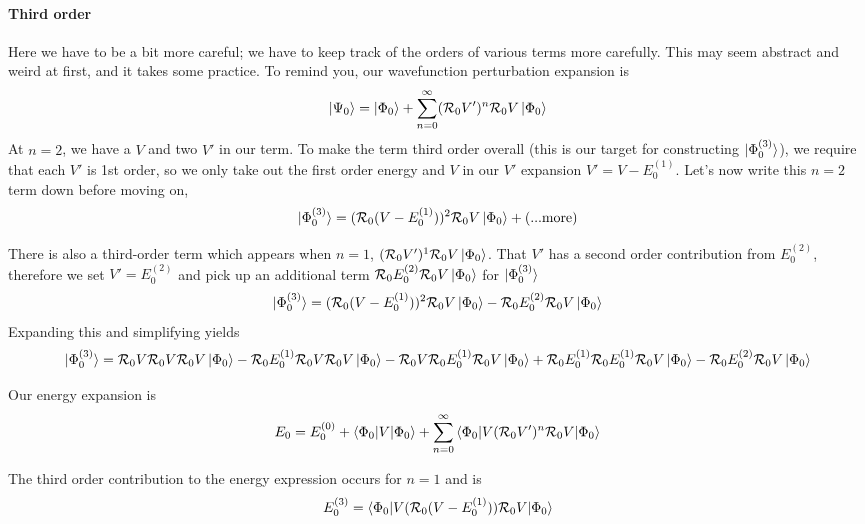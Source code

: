 \documentclass{article}
\newcommand{\Ezero}{E^{(0)}}
\newcommand{\Rz}{\mathcal{R}_{0}}
\newcommand{\Eone}{E^{(1)}}
\begin{document}
\paragraph{\textbf{Third order}}
Here we have to be a bit more careful; we have to keep track of the orders of various terms
more carefully. This may seem abstract and weird at first, and it takes some practice.
To remind you, our wavefunction perturbation expansion is 
\[\ket{\Psi_0} =  \ket{\Phi_0} + \sum_{n=0}^{\infty} (\Rz V')^n \Rz V \ket{\Phi_0} \]
At $n=2$, we have a $V$ and two $V'$ in our term.
To make the term third order overall (this is our target for constructing $\ket{\Phi_0^{(3)}}$),
we require that each $V'$ is 1st order, so we only take out the first order
energy and $V$ in our $V'$ expansion $V' = V - E_0^{(1)}$.
Let's now write this $n=2$ term down before moving on, 
\[\ket{\Phi_0^{(3)}} = (\Rz (V - \Eone_0))^2 \Rz V \ket{\Phi_0} + (... \mathrm{more})\]

There is also a third-order term which appears when $n=1$,
$(\Rz V')^1 \Rz V \ket{\Phi_0}$. That $V'$ has a second order contribution from $E_0^{(2)}$,
therefore we set $V' = E_0^{(2)}$ and 
pick up an additional term $ \Rz E_0^{(2)} \Rz V \ket{\Phi_0}$ for $\ket{\Phi_0^{(3)}}$
\[\ket{\Phi_0^{(3)}} = (\Rz (V - \Eone_0))^2 \Rz V \ket{\Phi_0} - \Rz E_0^{(2)} \Rz V \ket{\Phi_0} \]
Expanding this and simplifying yields
\[\ket{\Phi_0^{(3)}} = \Rz V \Rz V \Rz V \ket{\Phi_0} - \Rz \Eone_0 \Rz V \Rz V \ket{\Phi_0} 
  - \Rz V \Rz \Eone_0 \Rz V \ket{\Phi_0} + \Rz E_0^{(1)} \Rz E_0^{(1)} \Rz V \ket{\Phi_0} 
 - \Rz E_0^{(2)} \Rz V \ket{\Phi_0} \]

Our energy expansion is 
\[E_0 = \Ezero_0 + \braket{\Phi_0|V|\Phi_0} + \sum_{n=0}^{\infty} \braket{\Phi_0|V (\Rz V')^n \Rz V | \Phi_0}\]

The third order contribution to the energy expression occurs for $n=1$ and is 
\[ E_0^{(3)} = \braket{\Phi_0 | V ( \Rz (V - E_0^{(1)})) \Rz V | \Phi_0} \]
\end{document}
